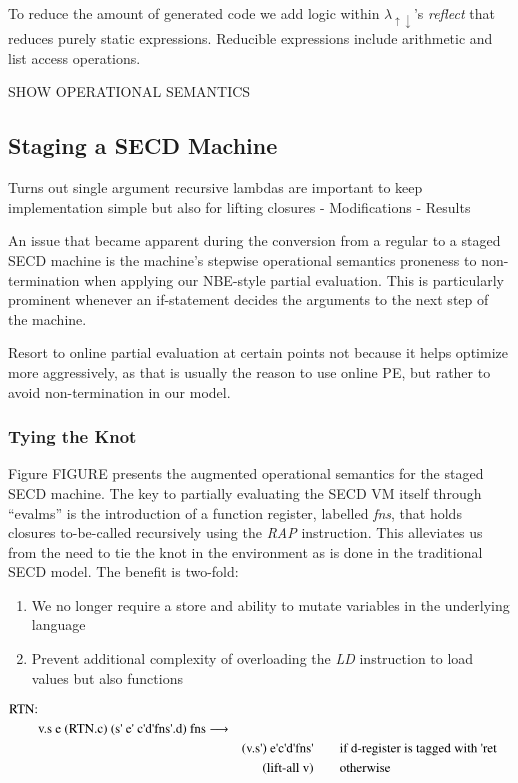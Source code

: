 \documentclass[fleqn]{article}
\theoremstyle{definition}
\newcommand{\ts}{\textquotesingle}
\newcommand{\mslang}{$\lambda_{\uparrow\downarrow}$}
\begin{document}
To reduce the amount of generated code we add logic within \mslang's \textit{reflect} that reduces purely static expressions. Reducible expressions include arithmetic and list access operations.

SHOW OPERATIONAL SEMANTICS


\subsection{Staging a SECD Machine}
Turns out single argument recursive lambdas are important to keep implementation simple but also for lifting closures
- Modifications
- Results

An issue that became apparent during the conversion from a regular to a staged SECD machine is the machine's stepwise operational semantics proneness to non-termination when applying our NBE-style partial evaluation. This is particularly prominent whenever an if-statement decides the arguments to the next step of the machine.

Resort to online partial evaluation at certain points not because it helps optimize more aggressively, as that is usually the reason to use online PE, but rather to avoid non-termination in our model.

\subsubsection{Tying the Knot}
Figure FIGURE presents the augmented operational semantics for the staged SECD machine. The key to partially evaluating the SECD VM itself through ``evalms'' is the introduction of a function register, labelled \textit{fns}, that holds closures to-be-called recursively using the \textit{RAP} instruction. This alleviates us from the need to tie the knot in the environment as is done in the traditional SECD model. The benefit is two-fold:
\begin{enumerate}
	\item We no longer require a store and ability to mutate variables in the underlying language
	\item Prevent additional complexity of overloading the \textit{LD} instruction to load values but also functions
\end{enumerate}

\begin{alignat*}{3}
		\text{RTN:} &																																							\\
		& \text{v.s e (RTN.c) (s{\ts} e{\ts} c\ts  d\ts  fns\ts.d) fns} \longrightarrow &&							\\
		&& \text{(v.s\ts)  e\ts  c\ts  d\ts  fns\ts} \quad	&&& \text{if d-register is tagged with {\ts}ret} 	\\
		&& \text{(lift-all v)}									 \quad &&& \text{otherwise}
\end{alignat*}
\end{document}

